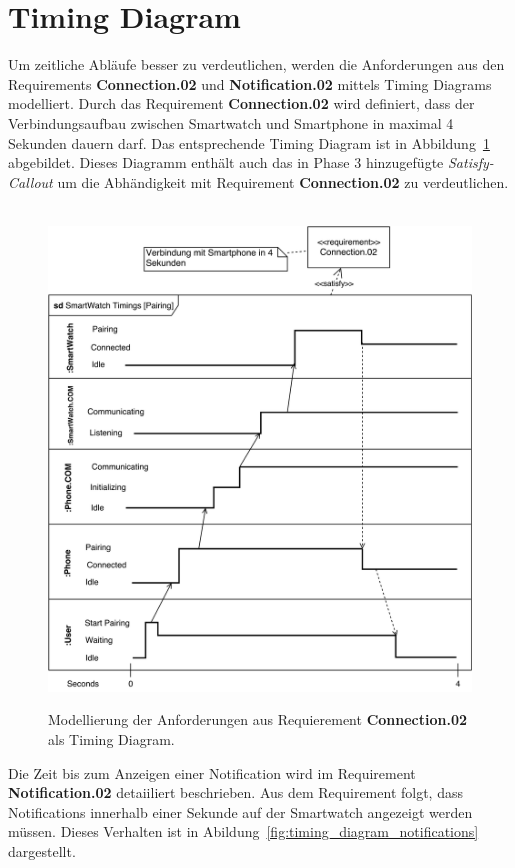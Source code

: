 \section{Timing Diagram}
Um zeitliche Abläufe besser zu verdeutlichen, werden die Anforderungen aus den Requirements \textbf{Connection.02} und \textbf{Notification.02} mittels Timing Diagrams modelliert. Durch das Requirement \textbf{Connection.02} wird definiert, dass der Verbindungsaufbau zwischen Smartwatch und Smartphone in maximal 4 Sekunden dauern darf. Das entsprechende Timing Diagram ist in Abbildung~\ref{fig:timing_diagram_pairing} abgebildet. Dieses Diagramm enthält auch das in Phase 3 hinzugefügte \textit{Satisfy-Callout} um die Abhändigkeit mit Requirement \textbf{Connection.02} zu verdeutlichen.

\begin{figure}[H]
\centering\
\includegraphics[width=12cm]{img/timing_diagram_pairing}
\caption[Timing Diagram: Pairing]{Modellierung der Anforderungen aus Requierement \textbf{Connection.02} als Timing Diagram. }
\label{fig:timing_diagram_pairing}
\end{figure}

Die Zeit bis zum Anzeigen einer \gls{Notification} wird im Requirement \textbf{Notification.02} detaiiliert beschrieben. Aus dem Requirement folgt, dass Notifications innerhalb einer Sekunde auf der Smartwatch angezeigt werden müssen. Dieses Verhalten ist in Abildung~\ref{fig:timing_diagram_notifications} dargestellt.

